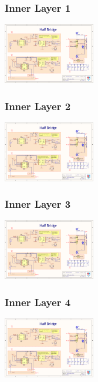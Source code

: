 \subsubsection{Inner Layer 1}
\begin{center}
	\includegraphics[page=3,width=0.3\textwidth,angle=90,origin=c]{./Appendix/Job3.pdf}
\end{center}
\subsubsection{Inner Layer 2}
\begin{center}
	\includegraphics[page=4,width=0.3\textwidth,angle=90,origin=c]{./Appendix/Job3.pdf}
\end{center}
\subsubsection{Inner Layer 3}
\begin{center}
	\includegraphics[page=5,width=0.3\textwidth,angle=90,origin=c]{./Appendix/Job3.pdf}
\end{center}
\subsubsection{Inner Layer 4}
\begin{center}
	\includegraphics[page=6,width=0.3\textwidth,angle=90,origin=c]{./Appendix/Job3.pdf}
\end{center}
